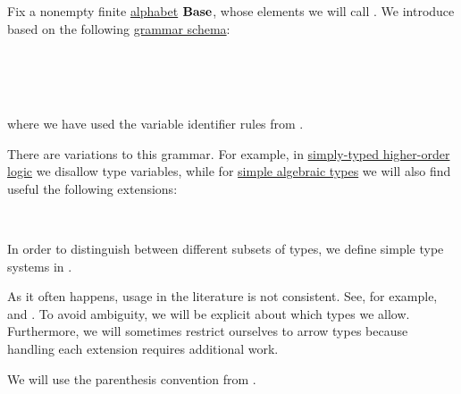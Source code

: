 \begin{definition}\label{def:simple_type}\mimprovised
  Fix a nonempty finite \hyperref[def:formal_language/alphabet]{alphabet} \( \op*{Base} \), whose elements we will call . We introduce  based on the following \hyperref[def:formal_grammar/schema]{grammar schema}:
  \begin{bnf*}
     {} \\
       { \bnfor {}} \\
        {\bnftsq{(} \bnfsp {} \bnfsp \bnftsq{\( \synimplies \)} \bnfsp {} \bnfsp \bnftsq{)}} \\
              { \bnfor {}}
  \end{bnf*}
  where we have used the variable identifier rules from .

  There are variations to this grammar. For example, in \hyperref[def:simply_typed_hol]{simply-typed higher-order logic} we disallow type variables, while for \hyperref[def:simple_algebraic_types]{simple algebraic types} we will also find useful the following extensions:
  \begin{bnf*}
     {\bnftsq{(} \bnfsp {} \bnfsp \bnftsq{\( \syntimes \)} \bnfsp {} \bnfsp \bnftsq{)}} \\
         {\bnftsq{(} \bnfsp {} \bnfsp \bnftsq{\( \synplus \)} \bnfsp {} \bnfsp \bnftsq{)}}
  \end{bnf*}

  In order to distinguish between different subsets of types, we define simple type systems in .
\end{definition}
\begin{comments}
  \item As it often happens, usage in the literature is not consistent. See, for example,  and . To avoid ambiguity, we will be explicit about which types we allow. Furthermore, we will sometimes restrict ourselves to arrow types because handling each extension requires additional work.

  \item We will use the parenthesis convention from .
\end{comments}

